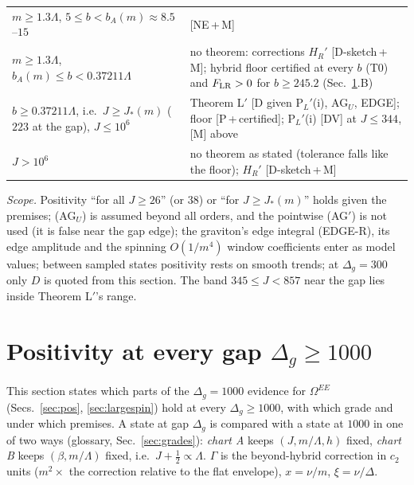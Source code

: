 \documentclass[aps,prl,onecolumn,superscriptaddress,nofootinbib]{revtex4-2}
\begin{document}
\begin{table}[!htbp]
\begin{ruledtabular}
\begin{tabular}{L{6.2cm}L{10.2cm}}
$m\ge1.3\Lambda$, $5\le b<b_A(m)\approx8.5$--$15$ & [NE\,+\,M]\\
$m\ge1.3\Lambda$, $b_A(m)\le b<0.37211\Lambda$ & no theorem: corrections $H_R'$ [D-sketch\,+\,M]; hybrid floor certified at every $b$ (T0) and $F_{\rm LR}>0$ for $b\ge245.2$ (Sec.~\ref{sec:allgap}.B)\\
$b\ge0.37211\Lambda$, i.e.\ $J\ge J_*(m)$ ($223$ at the gap), $J\le10^6$ & Theorem L$'$ [D given P$_L'$(i), AG$_U$, EDGE]; floor [P\,+\,certified]; P$_L'$(i) [DV] at $J\le344$, [M] above\\
$J>10^6$ & no theorem as stated (tolerance falls like the floor); $H_R'$ [D-sketch\,+\,M]\\
\end{tabular}
\end{ruledtabular}
\end{table}

\emph{Scope.} Positivity ``for all $J\ge26$'' (or $38$) or ``for $J\ge J_*(m)$'' holds given the premises; (AG$_U$) is assumed beyond all orders, and the pointwise (AG$'$) is not used (it is false near the gap edge); the graviton's edge integral (EDGE-R), its edge amplitude and the spinning $O(1/m^4)$ window coefficients enter as model values; between sampled states positivity rests on smooth trends; at $\Delta_g=300$ only $D$ is quoted from this section. The band $345\le J<857$ near the gap lies inside Theorem
L$'$'s range.

\section{Positivity at every gap \texorpdfstring{$\Delta_g\ge1000$}{Delta g >= 1000}}
\label{sec:allgap}

This section states which parts of the $\Delta_g=1000$ evidence for $\Omega^{EE}$ (Secs.~\ref{sec:pos},
\ref{sec:largespin}) hold at every $\Delta_g\ge1000$, with which grade and under which premises. A state at gap $\Delta_g$ is
compared with a state at $1000$ in one of two ways (glossary, Sec.~\ref{sec:grades}): \emph{chart A} keeps $(J,m/\Lambda,h)$ fixed,
\emph{chart B} keeps $(\beta,m/\Lambda)$ fixed, i.e.\ $J+\tfrac12\propto\Lambda$. $\Gamma$ is the beyond-hybrid correction in $c_2$ units
($m^2\times$ the correction relative to the flat envelope), $x=\nu/m$, $\xi=\nu/\Delta$. 
\end{document}
